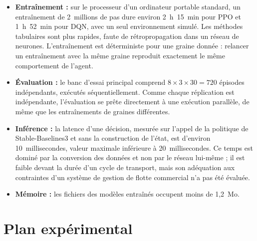 \documentclass[11pt,a4paper]{article}
\newif\ifrevmarks
\newcommand{\revtag}[1]{\ifrevmarks\textsuperscript{\textcolor{red!70!black}{\scriptsize[#1]}}\fi}
\newenvironment{revbloc}[1]{\par\ifrevmarks\color{revcolor}\noindent\revtag{#1}\ \fi}{\par}
\newcommand{\aexp}[1]{\ifrevmarks\textcolor{orange!85!black}{\textbf{[EXPÉRIENCE À FAIRE : #1]}}\fi}
\newcommand{\adir}[1]{\ifrevmarks\textcolor{violet}{\textbf{[À VALIDER AVEC LA DIRECTRICE : #1]}}\fi}
\begin{document}
\begin{revbloc}{M28, m20, m24}
\begin{itemize}
  \item \textbf{Entraînement :} sur le processeur d'un ordinateur portable standard, un entraînement de 2~millions de pas dure environ 2~h~15~min pour PPO et 1~h~52~min pour DQN, avec un seul environnement simulé. Les méthodes tabulaires sont plus rapides, faute de rétropropagation dans un réseau de neurones. L'entraînement est déterministe pour une graine donnée : relancer un entraînement avec la même graine reproduit exactement le même comportement de l'agent.
  \item \textbf{Évaluation :} le banc d'essai principal comprend $8 \times 3 \times 30 = 720$ épisodes indépendants, exécutés séquentiellement. Comme chaque réplication est indépendante, l'évaluation se prête directement à une exécution parallèle, de même que les entraînements de graines différentes.
  \item \textbf{Inférence :} la latence d'une décision, mesurée sur l'appel de la politique de Stable-Baselines3 et sans la construction de l'état, est d'environ 10~millisecondes, valeur maximale inférieure à 20~millisecondes. Ce temps est dominé par la conversion des données et non par le réseau lui-même ; il est faible devant la durée d'un cycle de transport, mais son adéquation aux contraintes d'un système de gestion de flotte commercial n'a pas été évaluée.
  \item \textbf{Mémoire :} les fichiers des modèles entraînés occupent moins de 1,2~Mo.
\end{itemize}
\end{revbloc}

\aexp{mesurer le temps total de calcul, le gain obtenu en parallélisant réplications et entraînements, et l'évolution du temps par décision avec la taille de la flotte, pour la dimension calcul attendue par Cluster Computing (M28).}

\adir{adéquation de la revue cible (Cluster Computing) si la dimension calcul reste limitée (M28).}


\section{Plan expérimental}
\label{sec:design}
\end{document}
